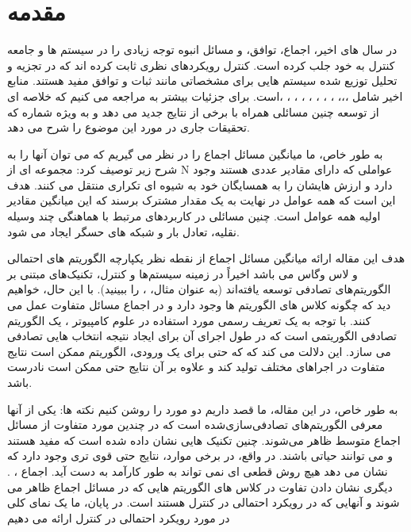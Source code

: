 \documentclass[12pt]{article} %
\begin{document}
	\section{مقدمه}
	در سال های اخیر، اجماع، توافق، و
	مسائل انبوه توجه زیادی را در سیستم ها و جامعه کنترل به خود جلب کرده است.
	کنترل رویکردهای نظری
	ثابت کرده اند که در تجزیه و تحلیل توزیع شده
	سیستم هایی برای مشخصاتی مانند ثبات و توافق مفید هستند.
	منابع اخیر شامل \cite{bib03}،\cite{bib04}،\cite{bib06}، \cite{bib07}، \cite{bib10}، \cite{bib12}، \cite{bib16}،
	\cite{bib18}، \cite{bib20}، \cite{bib21}، \cite{bib25}،\cite{bib27}است.
 برای جزئیات بیشتر به \cite{bib05} مراجعه می کنیم
	که خلاصه ای از توسعه چنین مسائلی همراه با برخی از نتایج جدید می دهد
	و به ویژه
	شماره \cite{bib01} که تحقیقات جاری در مورد این موضوع را شرح می دهد.
	\par
	به طور خاص، ما میانگین مسائل اجماع را در نظر می گیریم که می توان آنها را به شرح زیر توصیف کرد:
	مجموعه ای از N عواملی که دارای مقادیر عددی هستند وجود دارد
	و ارزش هایشان را به همسایگان خود به شیوه ای تکراری منتقل می کنند.
	هدف این است
	که همه عوامل در نهایت به یک مقدار مشترک برسند که این
	میانگین مقادیر اولیه همه عوامل است.
	چنین مسائلی
	در کاربردهای مرتبط با هماهنگی چند وسیله نقلیه،
	تعادل بار و شبکه های حسگر ایجاد می شود.
	\par
	هدف این مقاله ارائه میانگین مسائل اجماع از نقطه نظر یکپارچه الگوریتم های احتمالی و لاس وگاس می باشد
	اخیراً در زمینه
	سیستم‌ها و کنترل، تکنیک‌های مبتنی بر الگوریتم‌های تصادفی توسعه یافته‌اند (به عنوان مثال، \cite{bib23}، \cite{bib26} را ببینید).
	با این حال،
	خواهیم دید که چگونه کلاس های الگوریتم ها وجود دارد و
	در اجماع مسائل متفاوت عمل می کنند.
	با توجه
	به یک تعریف رسمی مورد استفاده در علوم کامپیوتر \cite{bib17}، یک
	الگوریتم تصادفی الگوریتمی است که در طول اجرای آن برای ایجاد نتیجه انتخاب هایی تصادفی می سازد.
	این دلالت می کند که
	که حتی برای یک ورودی، الگوریتم ممکن است نتایج متفاوت در اجراهای مختلف تولید کند
	و علاوه بر آن نتایج
	حتی ممکن است نادرست باشد.
	\par
	به طور خاص، در این مقاله، ما قصد داریم دو مورد را روشن کنیم
	نکته ها:
	یکی از آنها معرفی الگوریتم‌های تصادفی‌سازی‌شده است که در چندین مورد متفاوت از مسائل اجماع متوسط ​​ظاهر می‌شوند.
	چنین تکنیک هایی نشان داده شده است که مفید هستند و می توانند حیاتی باشند.
	در واقع، در برخی موارد، نتایج حتی قوی تری وجود دارد که نشان می دهد هیچ روش قطعی ای نمی تواند به طور کارآمد به دست آید.
	اجماع \cite{bib09}، \cite{bib17}.
	دیگری نشان دادن تفاوت در
	کلاس های الگوریتم هایی که در مسائل اجماع ظاهر می شوند
	و آنهایی که در رویکرد احتمالی در کنترل هستند است.
	در پایان، ما یک نمای کلی در مورد رویکرد احتمالی در کنترل ارائه می دهیم
\end{document}
